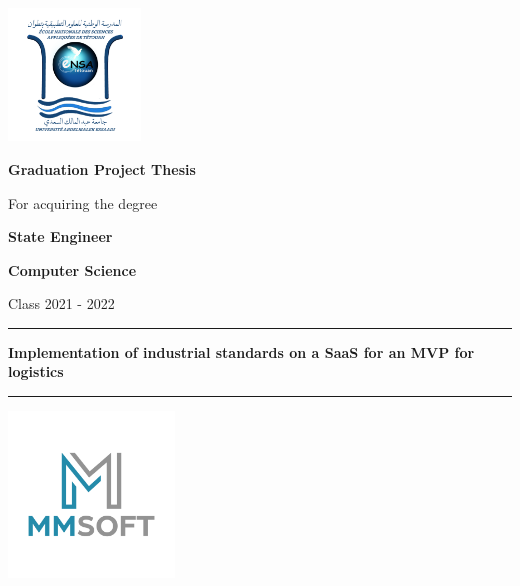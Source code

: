 \documentclass[12pt, a4paper, titlepage]{book}
\begin{document}
    \afterpage{\clearpage}
    \setlength{\parskip}{5pt}
    \setlength\itemsep{1em}

    \begin{titlepage}
    \thispagestyle{empty}
        \begin{center}
            \includegraphics[width=100pt]{images/logoEnsa}

            \LARGE{
                \textbf{Graduation Project Thesis}
            }

            \vspace*{0.6cm}

            \normalsize{For acquiring the degree}

            \vspace*{0.4cm}

            \Large
            \textbf{State Engineer}

            \vspace*{0.5cm}

            \large
            \textbf{Computer Science}

            \vspace*{0.6cm}

            \normalsize{Class 2021 - 2022}

            \vspace*{1.2cm}

            \hrule

            \vspace*{0.6cm}

            \Large
            \textbf{Implementation of industrial standards on a SaaS for an MVP for logistics}

            \vspace*{0.6cm}

            \hrule

            \vspace*{-0.5cm}

            \includegraphics[width=125pt]{images/logo}


\end{center}
\end{titlepage}
\end{document}
